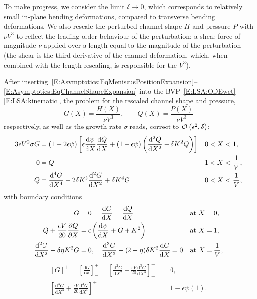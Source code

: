 \documentclass{jfm}
\newcommand{\dd}[2]{\frac{\mathrm{d} #1}{\mathrm{d} #2}}
\newcommand{\ddp}[2]{\frac{\partial #1}{\partial #2}}
\newcommand{\poisson}{\eta} %
\begin{document}
To make progress, we consider the limit $\delta \to 0$, which corresponds to relatively small in-plane bending deformations, compared to transverse bending deformations.  We  also  rescale  the  perturbed  channel  shape $H$ and  pressure $P$ with $\nu V^3$ to  reflect the leading order behaviour of the perturbation: a shear force of magnitude $\nu$ applied over a length equal to  the magnitude  of  the  perturbation  (the  shear  is  the  third  derivative  of  the  channel deformation, which, when combined with the length rescaling, is responsible for the $V^3$).

After inserting~\eqref{E:Asymptotics:EqMeniscusPositionExpansion}--\eqref{E:Asymptotics:EqChannelShapeExpansion} into the BVP~\eqref{E:LSA:ODEwet}--\eqref{E:LSA:kinematic}, the problem for the rescaled channel shape and pressure,
\begin{equation}
G(X) = \frac{H(X)}{\nu V^3}, \qquad Q(X) = \frac{P(X)}{\nu V^3}
\end{equation}
respectively, as well as the growth rate $\sigma$ reads, correct to $\mathcal{O}\left(\epsilon^2, \delta \right)$:
\begin{align}
3\epsilon V^2 \sigma G &= \left(1 + 2\epsilon \psi\right)\left[\epsilon\dd{\psi}{X} \dd{Q}{X} + \left(1 + \epsilon \psi\right)\left(\dd{^2 Q}{X^2} -\param K^2 Q\right)\right] & &0 < X < 1,\label{E:Asymptotics:ODEwet}\\
0 &= Q & &1 < X < \frac{1}{V},\label{E:Asymptotics:ODEdry}\\
Q &= \dd{^4 G}{X^4} - 2\param K^2 \dd{^2 G}{X^2} +\param K^4 G & &0 < X<\frac{1}{V},\label{A:Asymptotics:state_BVP:pressure2shape}
\end{align}
with boundary conditions
\begin{align}
G &= 0 = \dd{G}{X} = \dd{Q}{X} & &\text{at}~X = 0,\label{E:Asymptotics:BC_at_0}\\
Q + \frac{\epsilon V}{20}\ddp{Q}{X} &= \epsilon\left(\dd{\psi}{X} + G + K^2\right)  & &\text{at}~X= 1,\label{E:Asymptotics:pressure_bc}\\
\dd{^2 G}{X^2} -\param \poisson K^2 G &= 0, \quad  \dd{^3 G}{X^3} - (2-\poisson)\param K^2 \dd{G}{X} = 0 & &\text{at}~X = \frac{1}{V},\label{E:Asymptotics:BC_at_1}
\end{align}
\begin{align}\label{E:Asymptotics:jump_conds}
\left[G\right]_-^+= \left[\dd{G}{x}\right]_-^+ = \left[\dd{^2G}{X^2} + \frac{\epsilon V}{20}\dd{^3 G}{X^3}\right]_-^+&= 0, \\
\left[\dd{^3 G}{X^3} + \frac{\epsilon V}{20}\dd{^4 G}{X^4}\right]_-^+ &= 1 - \epsilon \psi(1).
\end{align}
\end{document}
